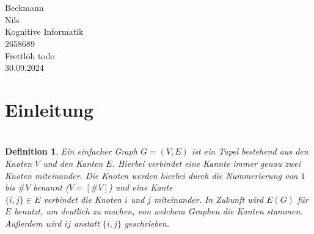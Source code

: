 \documentclass[12pt]{article}%
\theoremstyle{examplestyle}
\theoremstyle{examplestyle}
\theoremstyle{examplestyle}
\theoremstyle{examplestyle}
\theoremstyle{examplestyle}
\theoremstyle{examplestyle}
\newtheorem{defi}[theo]{Definition}%
\begin{document}
\newcommand{\3}{\ss}

\newcommand{\s}[1]{\mathcal{#1}}




{
  
  \begin{center}
    \\[1cm]
    \\[3cm]
  \end{center}

   Beckmann\\

   Nils\\

   Kognitive Informatik\\

   2658689\\[3cm]

   Frettlöh todo \\


   30.09.2024

  \thispagestyle{empty}
  \newpage
  
}{}

\tableofcontents
\thispagestyle{empty}
\newpage

\setcounter{page}{1}

\section{Einleitung}

\section{}

\section{}


\begin{defi}
  Ein einfacher Graph $G=(V,E)$ ist ein Tupel bestehend aus den Knoten $V$ und den Kanten $E$. Hierbei verbindet eine Kannte immer genau
  zwei Knoten miteinander. Die Knoten werden hierbei durch die Nummerierung von $1$ bis $\#V$  benannt ($V=[\#V]$) und eine Kante\\
  $\{i,j\}\in E$ verbindet
  die Knoten $i$ und $j$ miteinander. In Zukunft wird $E(G)$ für $E$ benutzt, um deutlich zu machen, von welchem Graphen die Kanten stammen.
  Außerdem wird $ij$ anstatt $\{i,j\}$ geschrieben.
\end{defi}
\end{document}
